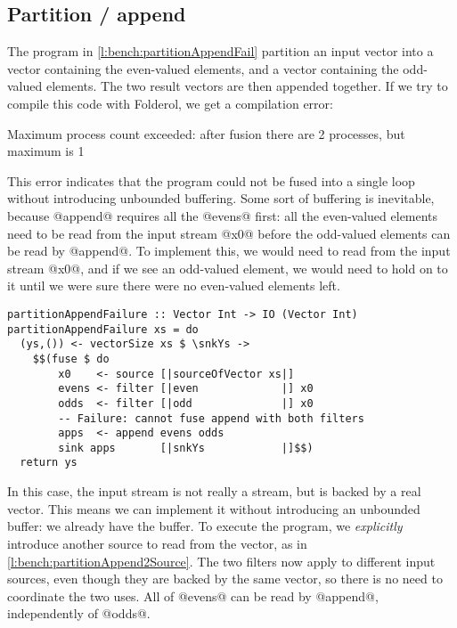 \subsection{Partition / append}

The program in \cref{l:bench:partitionAppendFail} partition an input vector into a vector containing the even-valued elements, and a vector containing the odd-valued elements.
The two result vectors are then appended together.
If we try to compile this code with Folderol, we get a compilation error:

\begin{code}
Maximum process count exceeded:
 after fusion there are 2 processes, but maximum is 1
\end{code}

This error indicates that the program could not be fused into a single loop without introducing unbounded buffering.
Some sort of buffering is inevitable, because @append@ requires all the @evens@ first: all the even-valued elements need to be read from the input stream @x0@ before the odd-valued elements can be read by @append@.
To implement this, we would need to read from the input stream @x0@, and if we see an odd-valued element, we would need to hold on to it until we were sure there were no even-valued elements left.

\begin{lstlisting}[float,label=l:bench:partitionAppendFail,caption=Partition / append fusion failure]
partitionAppendFailure :: Vector Int -> IO (Vector Int)
partitionAppendFailure xs = do
  (ys,()) <- vectorSize xs $ \snkYs ->
    $$(fuse $ do
        x0    <- source [|sourceOfVector xs|]
        evens <- filter [|even             |] x0
        odds  <- filter [|odd              |] x0
        -- Failure: cannot fuse append with both filters
        apps  <- append evens odds
        sink apps       [|snkYs            |]$$)
  return ys
\end{lstlisting}


In this case, the input stream is not really a stream, but is backed by a real vector.
This means we can implement it without introducing an unbounded buffer: we already have the buffer.
To execute the program, we \emph{explicitly} introduce another source to read from the vector, as in \cref{l:bench:partitionAppend2Source}.
The two filters now apply to different input sources, even though they are backed by the same vector, so there is no need to coordinate the two uses.
All of @evens@ can be read by @append@, independently of @odds@.

